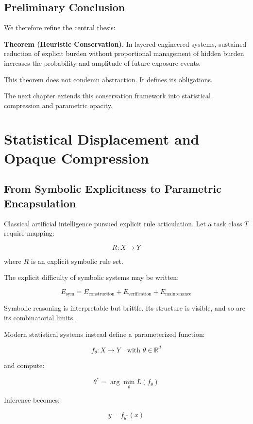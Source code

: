 \documentclass[11pt,openany]{book}
\begin{document}
\section{Preliminary Conclusion}

We therefore refine the central thesis:

\medskip

\textbf{Theorem (Heuristic Conservation).}
In layered engineered systems, sustained reduction of explicit burden without proportional management of hidden burden increases the probability and amplitude of future exposure events.

\medskip

This theorem does not condemn abstraction.
It defines its obligations.

The next chapter extends this conservation framework 
into statistical compression and parametric opacity.

\chapter{Statistical Displacement and Opaque Compression}

\section{From Symbolic Explicitness to Parametric Encapsulation}

Classical artificial intelligence pursued explicit rule articulation.
Let a task class $T$ require mapping:

\[
R : X \to Y
\]

where $R$ is an explicit symbolic rule set.

The explicit difficulty of symbolic systems may be written:

\[
E_{\text{sym}} = E_{\text{construction}} + E_{\text{verification}} + E_{\text{maintenance}}
\]

Symbolic reasoning is interpretable but brittle.
Its structure is visible, and so are its combinatorial limits.

Modern statistical systems instead define a parameterized function:

\[
f_\theta : X \to Y
\quad \text{with } \theta \in \mathbb{R}^d
\]

and compute:

\[
\theta^* = \arg\min_{\theta} L(f_\theta)
\]

Inference becomes:

\[
y = f_{\theta^*}(x)
\]
\end{document}
